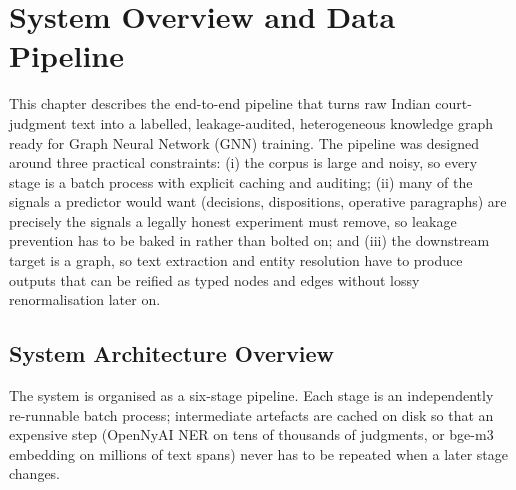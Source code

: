 \chapter{System Overview and Data Pipeline}
\label{chap:pipeline}

This chapter describes the end-to-end pipeline that turns raw Indian
court-judgment text into a labelled, leakage-audited, heterogeneous
knowledge graph ready for Graph Neural Network (GNN) training. The
pipeline was designed around three practical constraints: (i) the corpus
is large and noisy, so every stage is a batch process with explicit
caching and auditing; (ii) many of the signals a predictor would want
(decisions, dispositions, operative paragraphs) are precisely the signals
a legally honest experiment must remove, so leakage prevention has to be
baked in rather than bolted on; and (iii) the downstream target is a
graph, so text extraction and entity resolution have to produce outputs
that can be reified as typed nodes and edges without lossy renormalisation
later on.

\section{System Architecture Overview}

The system is organised as a six-stage pipeline. Each stage is an
independently re-runnable batch process; intermediate artefacts are
cached on disk so that an expensive step (OpenNyAI NER on tens of
thousands of judgments, or bge-m3 embedding on millions of text spans)
never has to be repeated when a later stage changes.

